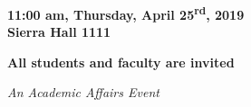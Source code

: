 \documentclass{article}
\begin{document}
\hfill\break

\begin{center}

\LARGE
{\bf 11:00 am, Thursday, April 25\textsuperscript{rd}, 2019\\
Sierra Hall 1111}\\

\vspace{15mm}

\large
{\bf All students and faculty are invited}\\

\hfill\break

\small
{\it An Academic Affairs Event}

\end{center}
\end{document}
